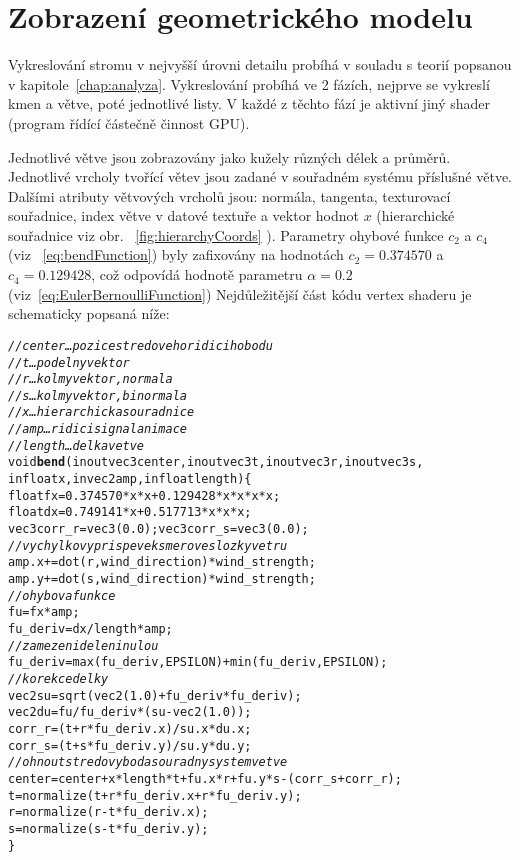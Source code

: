 \section{Zobrazení geometrického modelu}
\label{sec-3Ddisplay}
Vykreslování stromu v nejvyšší úrovni detailu probíhá v souladu s teorií popsanou v kapitole~\ref{chap:analyza}. Vykreslování probíhá ve 2 fázích, nejprve se vykreslí kmen a větve, poté jednotlivé listy. V každé z těchto fází je aktivní jiný shader (program řídící částečně činnost GPU).

%
 Jednotlivé větve jsou zobrazovány jako kužely různých délek a průměrů. Jednotlivé vrcholy tvořící větev jsou zadané v souřadném systému příslušné větve. Dalšími atributy větvových vrcholů jsou: normála, tangenta, texturovací souřadnice, index větve v datové textuře a vektor hodnot $x$ (hierarchické souřadnice viz obr. ~\ref{fig:hierarchyCoords} ). Parametry ohybové funkce $c_2$ a $c_4$ (viz ~\ref{eq:bendFunction}) byly zafixovány na hodnotách $c_2 = 0.374570$ a $c_4 = 0.129428$, což odpovídá hodnotě parametru $\alpha = 0.2$ (viz~\ref{eq:EulerBernoulliFunction})
 Nejdůležitější část kódu vertex shaderu je schematicky popsaná níže:
\begin{nobreak}  
\begin{alltt}
\textit{// center \dots pozice stredoveho ridiciho bodu}
\textit{// t \dots podelny vektor}
\textit{// r \dots kolmy vektor, normala}
\textit{// s \dots kolmy vektor, binormala}
\textit{// x \dots hierarchicka souradnice}
\textit{// amp \dots ridici signal animace}
\textit{// length \dots delka vetve}
void{\bf bend}(inout vec3 center, inout vec3 t, inout vec3 r, inout vec3 s,
          in float x, in vec2 amp, in float length)\{
  float fx = 0.374570*x*x + 0.129428*x*x*x*x;
  float dx = 0.749141*x + 0.517713*x*x*x;
  vec3 corr_r = vec3(0.0); vec3 corr_s = vec3(0.0);
\textit{// vychylkovy prispevek smerove slozky vetru }
  amp.x += dot(r, wind_direction) * wind_strength;
  amp.y += dot(s, wind_direction) * wind_strength;
\textit{// ohybova funkce }		
  fu	= fx	 * amp;
  fu_deriv = dx / length * amp ;
\textit{// zamezeni deleni nulou}
  fu_deriv = max(fu_deriv, EPSILON) + min(fu_deriv, EPSILON);
\textit{// korekce delky}		
  vec2 su = sqrt(vec2(1.0) + fu_deriv*fu_deriv);
  vec2 du = fu / fu_deriv * (su - vec2(1.0));
  corr_r = (t + r*fu_deriv.x)/su.x * du.x;
  corr_s = (t + s*fu_deriv.y)/su.y * du.y;
\textit{// ohnout stredovy bod a souradny system vetve}
  center =  center + x * length * t + fu.x * r + fu.y * s - (corr_s+corr_r);		
  t = normalize(t + r*fu_deriv.x + r*fu_deriv.y);
  r = normalize(r - t*fu_deriv.x);
  s = normalize(s - t*fu_deriv.y);	
\}\end{alltt}
\end{nobreak} 
